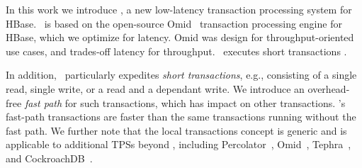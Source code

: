 
In this work we introduce \sys, a new low-latency transaction processing system for HBase. 
\sys\ is based on the open-source Omid~\cite{omid-blog,omid-fast} transaction processing engine for HBase, 
which we optimize for latency. Omid was design for throughput-oriented use cases, and trades-off latency for throughput.
\sys\ executes short transactions . 

In addition, \sys\ particularly expedites   \emph{short transactions}, e.g., consisting of a single read, single write, 
or a read and a dependant write. We
introduce an overhead-free \emph{fast path} for such transactions, which has  impact on other transactions.
\sys's fast-path transactions are  faster than the same transactions running without the fast path.
We further note that the local transactions concept is generic and is applicable to additional TPSs beyond \sys,
including Percolator~\cite{Percolator2010}, Omid~\cite{OmidICDE2014,omid-fast}, Tephra~\cite{tephra}, 
and CockroachDB~\cite{cockroach}. 


